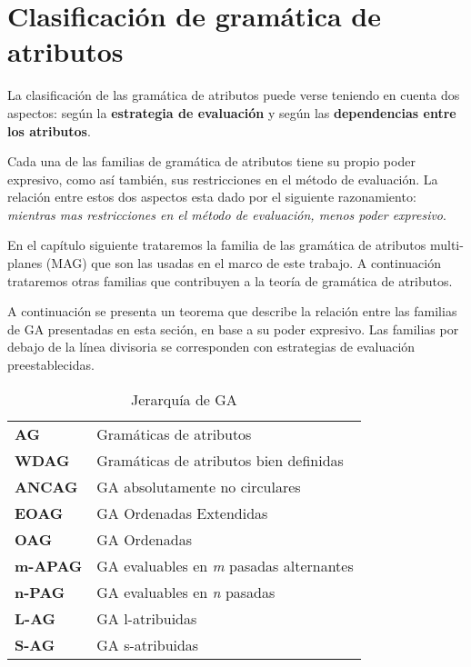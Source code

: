 \chapter{Clasificación de gramática de atributos}
\label{chap: clas_ag}
\minitoc

La clasificación de las gramática de atributos puede verse teniendo en cuenta dos aspectos: según la \textbf{estrategia de evaluación} y según las \textbf{dependencias entre los atributos}. 

Cada una de las familias de gramática de atributos tiene su propio poder expresivo, como así también, sus restricciones en el método de evaluación. La relación entre estos dos aspectos esta dado por el siguiente razonamiento: \textit{mientras mas restricciones en el método de evaluación, menos poder expresivo}.

En el capítulo siguiente trataremos la familia de las gramática de atributos multi-planes (MAG) que son las usadas en el marco de este trabajo. A continuación trataremos otras familias que contribuyen a la teoría de gramática de atributos.

A continuación se presenta un teorema que describe la relación entre las
familias de GA presentadas en esta seción, en base a su poder expresivo.
Las familias por debajo de la línea divisoria se corresponden con estrategias de
evaluación preestablecidas.

\begin{table}
\begin{center}
\begin{tabular}{ll}
\textbf{AG}         & Gramáticas de atributos \\
\textbf{WDAG}       & Gramáticas de atributos bien definidas\\
\textbf{ANCAG}      & GA absolutamente no circulares \\
\textbf{EOAG}       & GA Ordenadas Extendidas \\
\textbf{OAG}        & GA Ordenadas \\
\hline
\textbf{m-APAG} & GA evaluables en \emph{m} pasadas alternantes \\
\textbf{n-PAG}      & GA evaluables en \emph{n} pasadas \\
\textbf{L-AG}       & GA l-atribuidas \\
\textbf{S-AG}       & GA s-atribuidas \\
\end{tabular}
\end{center}
\caption{Jerarquía de GA}
\label{jer-GA}
\end{table}

